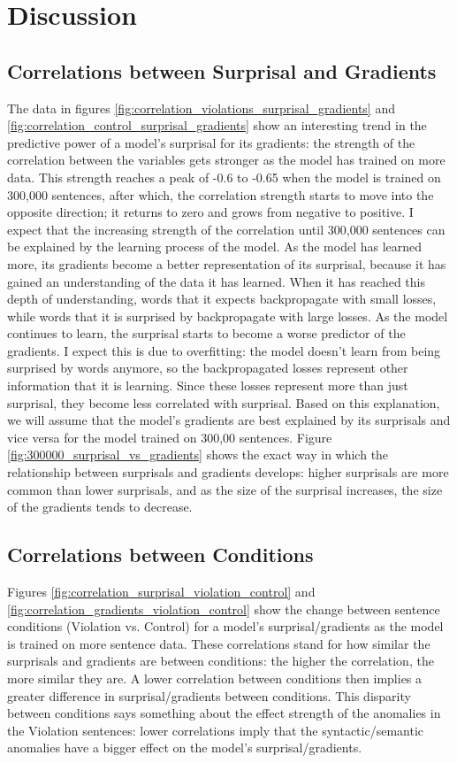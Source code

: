 \documentclass{IEEEtran}
\begin{document}
\section{Discussion}
\subsection{Correlations between Surprisal and Gradients}
The data in figures \ref{fig:correlation_violations_surprisal_gradients} and \ref{fig:correlation_control_surprisal_gradients} show an interesting trend in the predictive power of a model's surprisal for its gradients: the strength of the correlation between the variables gets stronger as the model has trained on more data.
This strength reaches a peak of -0.6 to -0.65 when the model is trained on 300,000 sentences, after which, the correlation strength starts to move into the opposite direction; it returns to zero and grows from negative to positive.
I expect that the increasing strength of the correlation until 300,000 sentences can be explained by the learning process of the model.
As the model has learned more, its gradients become a better representation of its surprisal, because it has gained an understanding of the data it has learned.
When it has reached this depth of understanding, words that it expects backpropagate with small losses, while words that it is surprised by backpropagate with large losses.
As the model continues to learn, the surprisal starts to become a worse predictor of the gradients.
I expect this is due to overfitting: the model doesn't learn from being surprised by words anymore, so the backpropagated losses represent other information that it is learning.
Since these losses represent more than just surprisal, they become less correlated with surprisal.
Based on this explanation, we will assume that the model's gradients are best explained by its surprisals and vice versa for the model trained on 300,00 sentences.
Figure \ref{fig:300000_surprisal_vs_gradients} shows the exact way in which the relationship between surprisals and gradients develops: higher surprisals are more common than lower surprisals, and as the size of the surprisal increases, the size of the gradients tends to decrease.

\subsection{Correlations between Conditions}
Figures \ref{fig:correlation_surprisal_violation_control} and \ref{fig:correlation_gradients_violation_control} show the change between sentence conditions (Violation vs. Control) for a model's surprisal/gradients as the model is trained on more sentence data.
These correlations stand for how similar the surprisals and gradients are between conditions: the higher the correlation, the more similar they are.
A lower correlation between conditions then implies a greater difference in surprisal/gradients between conditions.
This disparity between conditions says something about the effect strength of the anomalies in the Violation sentences: lower correlations imply that the syntactic/semantic anomalies have a bigger effect on the model's surprisal/gradients.
\end{document}
